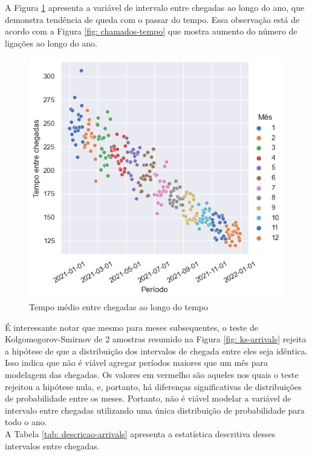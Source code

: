 A Figura \ref*{fig: arrivals-tempo} apresenta a variável de intervalo entre chegadas ao longo do ano, que demonstra tendência de queda com o passar do tempo. Essa observação está de acordo com a Figura \ref*{fig: chamados-tempo} que mostra aumento do número de ligações ao longo do ano. 

\begin{figure}[H]
    \includegraphics{analise-de-dados/anual/arrivals-tempo.png}
    \caption{Tempo médio entre chegadas ao longo do tempo}
    \label{fig: arrivals-tempo}
\end{figure}

É interessante notar que mesmo para meses subsequentes, o teste de Kolgomogorov-Smirnov de 2 amostras resumido na Figura \ref*{fig: ks-arrivals} rejeita a hipótese de que a distribuição dos intervalos de chegada entre eles seja idêntica. Isso indica que não é viável agregar períodos maiores que um mês para modelagem das chegadas. Os valores em vermelho são aqueles nos quais o teste rejeitou a hipótese nula, e, portanto, há diferenças significativas de distribuições de probabilidade entre os meses. Portanto, não é viável modelar a variável de intervalo entre chegadas utilizando uma única distribuição de probabilidade para todo o ano.\\
A Tabela \ref*{tab: descricao-arrivals} apresenta a estatística descritiva desses intervalos entre chegadas.


